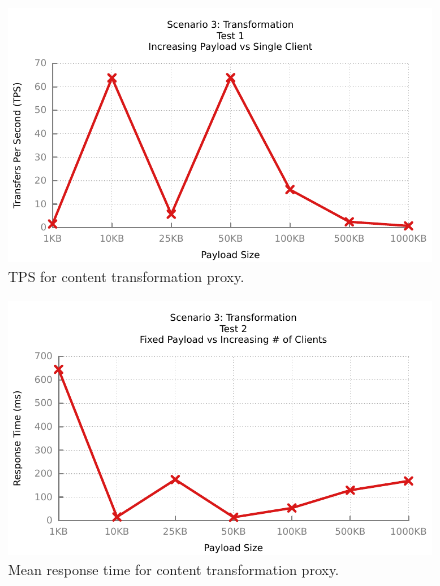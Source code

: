 \begin{figure}[H]
	\caption{TPS for content transformation proxy.}
	\centerline{\includegraphics{img/transform_fu_ip_tps}}
	\label{fig:transform-1-1}
\end{figure}

\begin{figure}[H]
	\label{fig:transform-1-2}
	\caption{Mean response time for content transformation proxy.}
	\centerline{\includegraphics{img/transform_fu_ip_resp}}
\end{figure}

